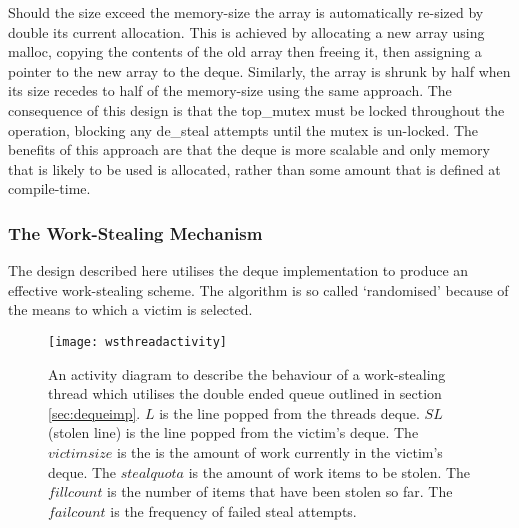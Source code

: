 Should the size exceed the memory-size the array is automatically re-sized by double its current allocation. 
This is achieved by allocating a new array using malloc, copying the contents of the old array then freeing it, 
then assigning a pointer to the new array to the deque. 
Similarly, the array is shrunk by half when its size recedes to half of the memory-size using the same approach.
The consequence of this design is that the top\_mutex must be locked throughout the operation, blocking any de\_steal
attempts until the mutex is un-locked. 
The benefits of this approach are that the deque is more scalable and only memory that is likely to be used is allocated, 
rather than some amount that is defined at compile-time.

\subsubsection*{The Work-Stealing Mechanism}

The design described here utilises the deque implementation to produce an effective work-stealing scheme.
The algorithm is so called `randomised' because of the means to which a victim is selected.

\begin{figure}[h]
\centering
\texttt{[image: wsthreadactivity]}
\caption{
An activity diagram to describe the behaviour of a work-stealing thread which utilises 
the double ended queue outlined in section \ref{sec:dequeimp}. 
\(L\) is the line popped from the threads deque. 
\(SL\) (stolen line) is the line popped from the victim's deque.
The \(victimsize\) is the is the amount of work currently in the victim's deque.
The \(stealquota\) is the amount of work items to be stolen.
The \(fillcount\) is the number of items that have been stolen so far.
The \(failcount\) is the frequency of failed steal attempts.
}
\label{fig:wsthreadactivity}
\end{figure}


